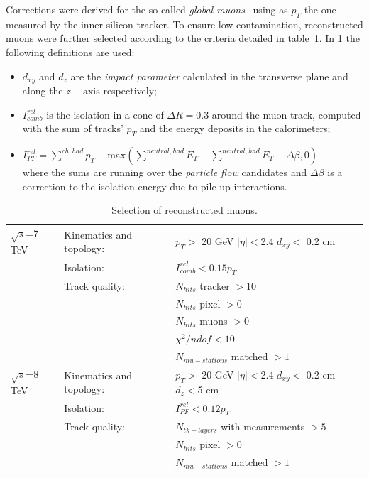 Corrections were derived for the so-called {\it global
  muons}~\cite{Chatrchyan:2013sba} using as $p_T$ the one measured by
the inner silicon tracker. To ensure low contamination, reconstructed
muons were further selected according to the criteria detailed in
table~\ref{tab:muon_selection}. In \ref{tab:muon_selection} the following
definitions are used:
\begin{itemize}
\item $d_{xy}$ and $d_{z}$ are the \textit{impact parameter} calculated in the transverse 
plane and along the $z-\mathrm{axis}$ respectively;
\item $I^{rel}_{comb}$ is the isolation in a cone of $\Delta R =0.3$ around the muon 
track, computed with the sum of tracks' $p_{T}$ and the energy deposits in the calorimeters;
\item $I^{rel}_{PF}=\sum ^{ch,had}p_{T}+\mathrm{max}\left( \sum ^{neutral,had}E_{T} + \sum ^{neutral,had}E_{T} -\Delta\beta ,0 \right)$ \\
where the sums are running over the \textit{particle flow} \cite{CMS:2010aua} candidates and 
$\Delta \beta$ is a correction to the isolation energy due to pile-up interactions. 
\end{itemize}

\begin{table}[hbH]
\begin{center}
\caption{Selection of reconstructed muons.\label{tab:muon_selection}}
\begin{tabular}{|l|ll|}
\hline
$\sqrt{s}$=7 TeV & Kinematics and topology:& $p_T>$ 20 GeV $|\eta|<$2.4 $d_{xy}<$ 0.2 cm \\
                 & Isolation: & $I^{rel}_{comb}<0.15 p_T$ \\
                 & Track quality: & $N_{hits}$  tracker $>10$ \\ && $N_{hits}$ pixel $>0$ \\&& $N_{hits}$ muons $>0$ \\&&  $\chi^2/ndof < 10$ \\
& & $N_{mu-stations}$ matched $>1$  \\
\hline
$\sqrt{s}$=8 TeV & Kinematics and topology:& $p_T>$ 20 GeV $|\eta|<$2.4 $d_{xy}<$ 0.2 cm $d_{z}<$5 cm \\
& Isolation: & $I^{rel}_{PF}<0.12 p_T$ \\
& Track quality: & $N_{tk-layers}$ with measurements $>5$  \\ && $N_{hits}$ pixel $>0$\\
& & $N_{mu-stations}$ matched $>1$  \\
\hline
\end{tabular}
\end{center}
\end{table}

